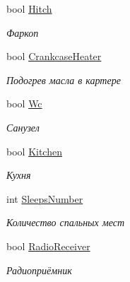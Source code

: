\begin{DoxyCompactItemize}
bool \hyperlink{class_r_t_1_1_parsing_libs_1_1_models_1_1_automoto_additional_info_af45ecfda3363f659a051bcf1bde01dbd}{Hitch}
\begin{DoxyCompactList}\small\item\em Фаркоп \end{DoxyCompactList}\item 
bool \hyperlink{class_r_t_1_1_parsing_libs_1_1_models_1_1_automoto_additional_info_a0d6690965f236754fc10cb1f18530bfa}{Crankcase\+Heater}
\begin{DoxyCompactList}\small\item\em Подогрев масла в картере \end{DoxyCompactList}\item 
bool \hyperlink{class_r_t_1_1_parsing_libs_1_1_models_1_1_automoto_additional_info_a5baee81f6ccd87595df1a3ade5059f3a}{Wc}
\begin{DoxyCompactList}\small\item\em Санузел \end{DoxyCompactList}\item 
bool \hyperlink{class_r_t_1_1_parsing_libs_1_1_models_1_1_automoto_additional_info_af9677be196c01f8bfc0c622f13a2e1d1}{Kitchen}
\begin{DoxyCompactList}\small\item\em Кухня \end{DoxyCompactList}\item 
int \hyperlink{class_r_t_1_1_parsing_libs_1_1_models_1_1_automoto_additional_info_acb98ff5705160ca424768d75ec2ad7a5}{Sleeps\+Number}
\begin{DoxyCompactList}\small\item\em Количество спальных мест \end{DoxyCompactList}\item 
bool \hyperlink{class_r_t_1_1_parsing_libs_1_1_models_1_1_automoto_additional_info_aa170170f83a3d616d96e00505ed3d583}{Radio\+Receiver}
\begin{DoxyCompactList}\small\item\em Радиоприёмник \end{DoxyCompactList}\item 

\end{DoxyCompactItemize}
